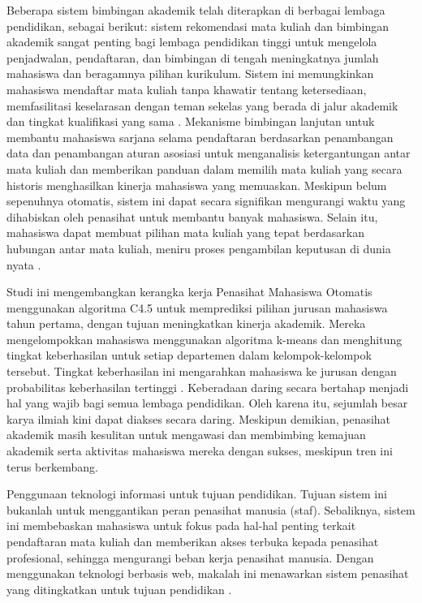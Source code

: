     Beberapa sistem bimbingan akademik telah diterapkan di berbagai lembaga pendidikan, sebagai berikut: sistem rekomendasi mata kuliah dan bimbingan akademik sangat penting bagi lembaga pendidikan tinggi untuk mengelola penjadwalan, pendaftaran, dan bimbingan di tengah meningkatnya jumlah mahasiswa dan beragamnya pilihan kurikulum. Sistem ini memungkinkan mahasiswa mendaftar mata kuliah tanpa khawatir tentang ketersediaan, memfasilitasi keselarasan dengan teman sekelas yang berada di jalur akademik dan tingkat kualifikasi yang sama \citep{Daramola2014}. Mekanisme bimbingan lanjutan untuk membantu mahasiswa sarjana selama pendaftaran berdasarkan penambangan data dan penambangan aturan asosiasi untuk menganalisis ketergantungan antar mata kuliah dan memberikan panduan dalam memilih mata kuliah yang secara historis menghasilkan kinerja mahasiswa yang memuaskan. Meskipun belum sepenuhnya otomatis, sistem ini dapat secara signifikan mengurangi waktu yang dihabiskan oleh penasihat untuk membantu banyak mahasiswa. Selain itu, mahasiswa dapat membuat pilihan mata kuliah yang tepat berdasarkan hubungan antar mata kuliah, meniru proses pengambilan keputusan di dunia nyata \citep{keylist}.
    
    Studi ini mengembangkan kerangka kerja Penasihat Mahasiswa Otomatis menggunakan algoritma C4.5 untuk memprediksi pilihan jurusan mahasiswa tahun pertama, dengan tujuan meningkatkan kinerja akademik. Mereka mengelompokkan mahasiswa menggunakan algoritma k-means dan menghitung tingkat keberhasilan untuk setiap departemen dalam kelompok-kelompok tersebut. Tingkat keberhasilan ini mengarahkan mahasiswa ke jurusan dengan probabilitas keberhasilan tertinggi \citep{MohamedAly2013}. Keberadaan daring secara bertahap menjadi hal yang wajib bagi semua lembaga pendidikan. Oleh karena itu, sejumlah besar karya ilmiah kini dapat diakses secara daring. Meskipun demikian, penasihat akademik masih kesulitan untuk mengawasi dan membimbing kemajuan akademik serta aktivitas mahasiswa mereka dengan sukses, meskipun tren ini terus berkembang.

    Penggunaan teknologi informasi untuk tujuan pendidikan. Tujuan sistem ini bukanlah untuk menggantikan peran penasihat manusia (staf). Sebaliknya, sistem ini membebaskan mahasiswa untuk fokus pada hal-hal penting terkait pendaftaran mata kuliah dan memberikan akses terbuka kepada penasihat profesional, sehingga mengurangi beban kerja penasihat manusia. Dengan menggunakan teknologi berbasis web, makalah ini menawarkan sistem penasihat yang ditingkatkan untuk tujuan pendidikan \citep{NsikanAbasi2016}.
    
